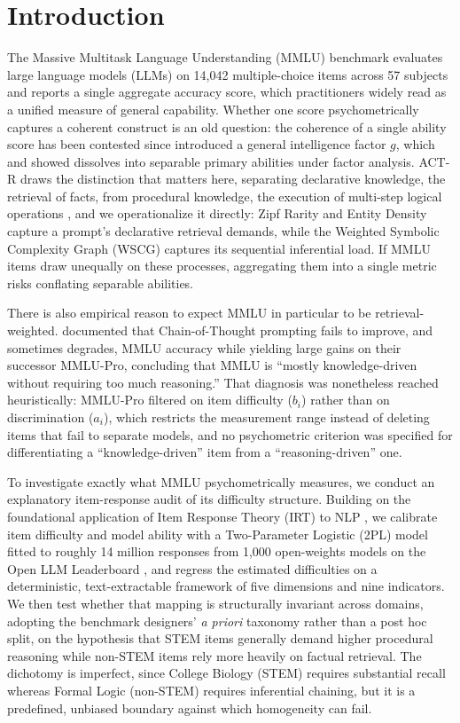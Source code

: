 \section{Introduction}\label{introduction}

The Massive Multitask Language Understanding (MMLU) benchmark \citep{hendrycks2021} evaluates large language models (LLMs) on 14,042 multiple-choice items across 57 subjects and reports a single aggregate accuracy score, which practitioners widely read as a unified measure of general capability. Whether one score psychometrically captures a coherent construct is an old question: the coherence of a single ability score has been contested since \citet{spearman1904} introduced a general intelligence factor $g$, which \citet{thurstone1938} and \citet{carroll1993} showed dissolves into separable primary abilities under factor analysis. ACT-R draws the distinction that matters here, separating declarative knowledge, the retrieval of facts, from procedural knowledge, the execution of multi-step logical operations \citep{anderson1983,tulving1972}, and we operationalize it directly: Zipf Rarity and Entity Density capture a prompt's declarative retrieval demands, while the Weighted Symbolic Complexity Graph (WSCG) captures its sequential inferential load. If MMLU items draw unequally on these processes, aggregating them into a single metric risks conflating separable abilities.

There is also empirical reason to expect MMLU in particular to be retrieval-weighted. \citet{wang2024} documented that Chain-of-Thought prompting fails to improve, and sometimes degrades, MMLU accuracy while yielding large gains on their successor MMLU-Pro, concluding that MMLU is ``mostly knowledge-driven without requiring too much reasoning.'' That diagnosis was nonetheless reached heuristically: MMLU-Pro filtered on item difficulty ($b_{i}$) rather than on discrimination ($a_{i}$), which restricts the measurement range instead of deleting items that fail to separate models, and no psychometric criterion was specified for differentiating a ``knowledge-driven'' item from a ``reasoning-driven'' one.

To investigate exactly what MMLU psychometrically measures, we conduct an explanatory item-response audit of its difficulty structure. Building on the foundational application of Item Response Theory (IRT) to NLP \citep{lalor2019}, we calibrate item difficulty and model ability with a Two-Parameter Logistic (2PL) model fitted to roughly 14 million responses from 1,000 open-weights models on the Open LLM Leaderboard \citep{beeching2023}, and regress the estimated difficulties on a deterministic, text-extractable framework of five dimensions and nine indicators. We then test whether that mapping is structurally invariant across domains, adopting the benchmark designers' \emph{a priori} taxonomy rather than a post hoc split, on the hypothesis that STEM items generally demand higher procedural reasoning while non-STEM items rely more heavily on factual retrieval. The dichotomy is imperfect, since College Biology (STEM) requires substantial recall whereas Formal Logic (non-STEM) requires inferential chaining, but it is a predefined, unbiased boundary against which homogeneity can fail.

